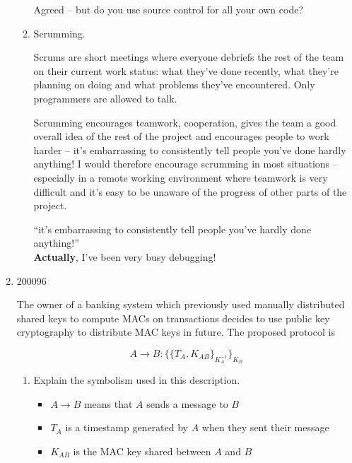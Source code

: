 \documentclass[10pt,\jkfside,a4paper]{article}
\begin{document}
\begin{enumerate}
\begin{enumerate}
{\color{blue}
Agreed -- but do you use source control for all your own code?
}

\item Scrumming.

Scrums are short meetings where everyone debriefs the rest of the team on their
current work status: what they've done recently, what they're planning on doing
and what problems they've encountered. Only programmers are allowed to talk.

Scrumming encourages teamwork, cooperation, gives the team a good overall
idea of the rest of the project and encourages people to work harder -- it's
embarrassing to consistently tell people you've done hardly anything! I would
therefore encourage scrumming in most situations -- especially in a remote
working environment where teamwork is very difficult and it's easy to be
unaware of the progress of other parts of the project.

{\color{blue}
``it's embarrassing to consistently tell people you've hardly done anything!''\\
\textbf{Actually}, I've been very busy debugging!
}

\end{enumerate}

\item 

\begin{examquestion}{2000}{9}{6}

The owner of a banking system which previously used manually distributed shared
keys to compute MACs on transactions decides to use public key cryptography to
distribute MAC keys in future. The proposed protocol is

\[
A \rightarrow B: \{\{T_A, K_{AB}\}_{K_A^{-1}}\}_{K_B}
\]

\begin{enumerate}[label=(\alph*)]

\item Explain the symbolism used in this description.

\begin{itemize}

\item $A \rightarrow B$ means that $A$ sends a message to $B$

\item $T_A$ is a timestamp generated by $A$ when they sent their message

\item $K_{AB}$ is the MAC key shared between $A$ and $B$


\end{itemize}
\end{enumerate}
\end{examquestion}
\end{enumerate}
\end{document}

